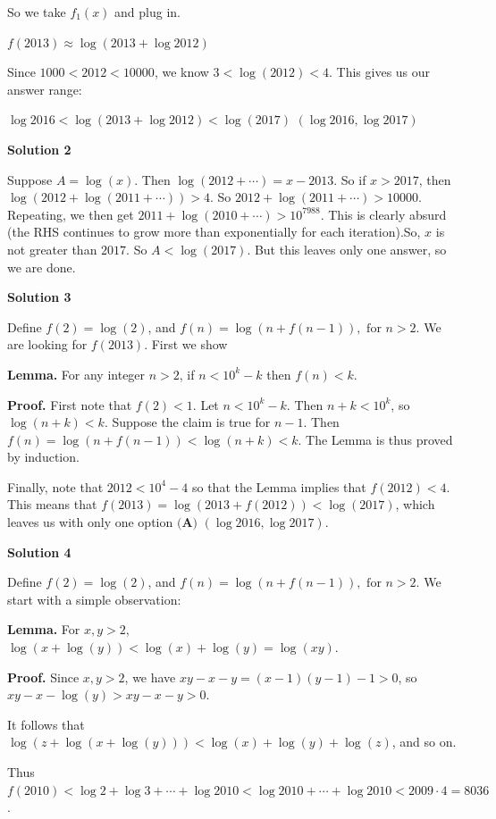 \begin{enumerate}
 So we take $f_{1}(x)$ and plug in.

 $f(2013) \approx \log(2013 + \log 2012)$

 Since $1000 < 2012 < 10000$, we know $3 < \log(2012) < 4$. This gives us our answer range:

 $\log 2016 < \log(2013 + \log 2012) < \log(2017)$
$(\log 2016, \log 2017)$




\textbf{Solution 2}

Suppose $A=\log(x)$. Then $\log(2012+ \cdots)=x-2013$. So if $x>2017$, then $\log(2012+\log(2011+\cdots))>4$. So $2012+\log(2011+\cdots)>10000$. Repeating, we then get $2011+\log(2010+\cdots)>10^{7988}$. This is clearly absurd (the RHS continues to grow more than exponentially for each iteration).So, $x$ is not greater than $2017$. So $A<\log(2017)$. But this leaves only one answer, so we are done.

 



\textbf{Solution 3}

Define $f(2) = \log(2)$, and $f(n) = \log(n+f(n-1)), \text{ for } n > 2.$ We are looking for $f(2013)$. First we show

 \textbf{Lemma.} For any integer $n>2$, if $n < 10^k-k$ then $f(n) < k$.

 \textbf{Proof.} First note that $f(2) < 1$. Let $n<10^k-k$. Then $n+k<10^k$, so $\log(n+k)< k$. Suppose the claim is true for $n-1$. Then $f(n) = \log(n+f(n-1)) < \log(n + k) < k$.  The Lemma is thus proved by induction.

 Finally, note that $2012 < 10^4 - 4$ so that the Lemma implies that $f(2012) < 4$. This means that $f(2013) = \log(2013+f(2012)) < \log(2017)$, which leaves us with only one option $\boxed{\textbf{(A) } (\log 2016, \log 2017)}$.

 



\textbf{Solution 4}

Define $f(2) = \log(2)$, and $f(n) = \log(n+f(n-1)), \text{ for } n > 2.$ We start with a simple observation:

 \textbf{Lemma.} For $x,y>2$, $\log(x+\log(y)) < \log(x)+\log(y)=\log(xy)$.

 \textbf{Proof.} Since $x,y>2$, we have $xy-x-y = (x-1)(y-1) - 1 > 0$, so $xy - x-\log(y) > xy - x - y > 0$.

 It follows that $\log(z+\log(x+\log(y))) < \log(x)+\log(y)+\log(z)$, and so on. 

 Thus $f(2010) < \log 2 + \log 3 + \cdots + \log 2010 < \log 2010 + \cdots + \log 2010 <  2009\cdot 4 = 8036$. 


\end{enumerate}
